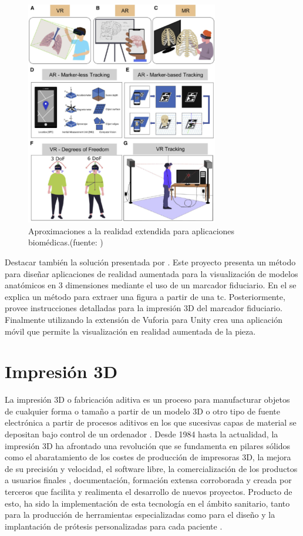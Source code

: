 \begin{figure}
  \centering
  \includegraphics[width=0.75\textwidth]{imaxes/aproxVR.png}
  \caption{Aproximaciones a la realidad extendida para aplicaciones biomédicas.(fuente: \cite{Venkatesan2021})}
  \label{fig:vrAproximations}
\end{figure}

Destacar también la solución presentada por \cite{MoretaMartinez2020}. Este proyecto presenta un método para diseñar aplicaciones de realidad aumentada para la visualización de modelos anatómicos en 3 dimensiones mediante el uso de un marcador fiduciario. En el se explica un método para extraer una figura a partir de una \acrshort{tc}. Posteriormente, provee instrucciones detalladas para la impresión 3D del marcador fiduciario. Finalmente utilizando la extensión de Vuforia para Unity crea una aplicación móvil que permite la visualización en realidad aumentada de la pieza. 

\section{Impresión 3D}
La impresión 3D o fabricación aditiva es un proceso para manufacturar objetos de cualquier forma o tamaño a partir de un modelo 3D o otro tipo de fuente electrónica a partir de procesos aditivos en los que sucesivas capas de material se depositan bajo control de un ordenador \cite{yan_dong_su_han_song_wei_shi_2018}.
Desde 1984 \cite{ChanaRodrguez2016} hasta la actualidad, la impresión 3D ha afrontado una revolución que se fundamenta en pilares sólidos como el abaratamiento de los costes de producción de impresoras 3D, la mejora de su precisión y velocidad, el software libre, la comercialización de los productos a usuarios finales , documentación, formación extensa corroborada y creada por terceros que facilita y realimenta el desarrollo de nuevos proyectos.
Producto de esto, ha sido la implementación de esta tecnología en el ámbito sanitario, tanto para la producción de herramientas especializadas \cite{ChanaRodrguez2016} como para el diseño y la implantación de prótesis personalizadas para cada paciente \cite{Gonzalez_Alvarez_2021}.

